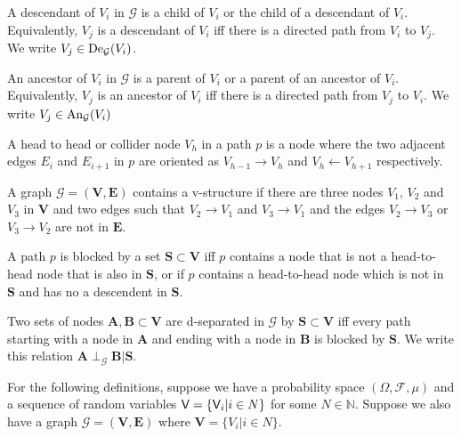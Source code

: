 \begin{definition}\label{def:descendants_and_ancestors}
A descendant of $V_i$ in $\mathcal{G}$ is a child of $V_i$ or the child of a descendant of $V_i$. Equivalently, $V_j$ is a descendant of $V_i$ iff there is a directed path from $V_i$ to $V_j$. We write $V_j\in \text{De}_{\mathcal{G}}(V_i)$.

An ancestor of $V_i$ in $\mathcal{G}$ is a parent of $V_i$ or a parent of an ancestor of $V_i$. Equivalently, $V_j$ is an ancestor of $V_i$ iff there is a directed path from $V_j$ to $V_i$. We write $V_j\in \text{An}_{\mathcal{\mathcal{G}}}(V_i)$
\end{definition}

\begin{definition}
A head to head or collider node $V_{h}$ in a path $p$ is a node where the two adjacent edges $E_i$ and $E_{i+1}$ in $p$ are oriented as $V_{h-1}\rightarrow V_h$ and $V_h\leftarrow V_{h+1}$ respectively.
\end{definition}

\begin{definition}[V-structure]\label{def:v_structure}
A graph $\mathcal{G}=(\mathbf{V},\mathbf{E})$ contains a v-structure if there are three nodes $V_1$, $V_2$ and $V_3$ in $\mathbf{V}$ and two edges such that $V_2\to V_1$ and $V_3\to V_1$ and the edges $V_2\to V_3$ or $V_3\to V_2$ are not in $\mathbf{E}$.

\end{definition}

\begin{definition}
A path $p$ is blocked by a set $\mathbf{S}\subset \mathbf{V}$ iff $p$ contains a node that is not a head-to-head node that is also in $\mathbf{S}$, or if $p$ contains a head-to-head node which is not in $\mathbf{S}$ and has no a descendent in $\mathbf{S}$.
\end{definition}

\begin{definition}[d-separation]\label{def:dsep}
Two sets of nodes $\mathbf{A},\mathbf{B}\subset \mathbf{V}$ are d-separated in $\mathcal{G}$ by $\mathbf{S}\subset \mathbf{V}$ iff every path starting with a node in $\mathbf{A}$ and ending with a node in $\mathbf{B}$ is blocked by $\mathbf{S}$. We write this relation $\mathbf{A} \perp_{\mathcal{G}} \mathbf{B} | \mathbf{S}$.
\end{definition}


For the following definitions, suppose we have a probability space $(\Omega,\mathcal{F},\mu)$ and a sequence of random variables $\mathsf{V}=\{\mathsf{V}_i|i\in N\}$ for some $N\in\mathbb{N}$. Suppose we also have a graph $\mathcal{G}=(\mathbf{V},\mathbf{E})$ where $\mathbf{V}=\{V_i|i\in N\}$.

